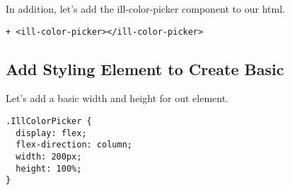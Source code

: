 In addition, let's add the ill-color-picker component to our html.
\begin{lstlisting}
+ <ill-color-picker></ill-color-picker>
\end{lstlisting}

\subsection{ Add Styling Element to Create Basic  }
Let's add a basic width and height for out element.
\begin{lstlisting}
.IllColorPicker {
  display: flex;
  flex-direction: column;
  width: 200px;
  height: 100%;
}
\end{lstlisting}
